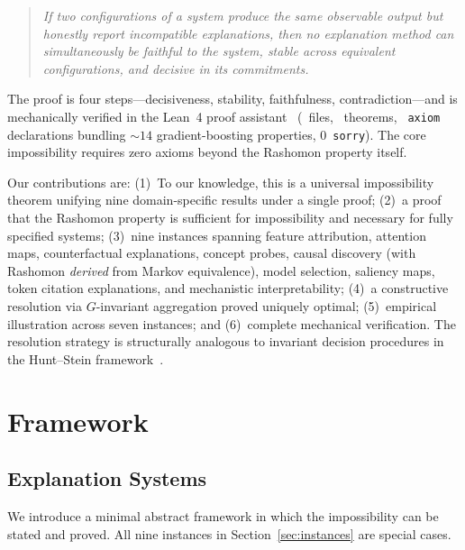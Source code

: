 \documentclass[twocolumn]{article}
\begin{document}
\begin{quote}
\emph{If two configurations of a system produce the same observable output
but honestly report incompatible explanations, then no explanation method
can simultaneously be faithful to the system, stable across equivalent
configurations, and decisive in its commitments.}
\end{quote}

\noindent
The proof is four steps---decisiveness, stability, faithfulness,
contradiction---and is mechanically verified in the Lean~4 proof
assistant~\cite{demoura2021lean4} (\ClaimMainFiles~files, \ClaimMainTheorems~theorems,
\ClaimMainAxioms~\texttt{axiom} declarations bundling ${\sim}14$ gradient-boosting
properties, 0~\texttt{sorry}). The core impossibility requires zero axioms beyond
the Rashomon property itself.

Our contributions are: (1)~To our knowledge, this is a universal impossibility theorem unifying
nine domain-specific results under a single proof; (2)~a proof that the
Rashomon property is sufficient for impossibility and necessary for fully
specified systems; (3)~nine instances spanning
feature attribution, attention maps, counterfactual explanations, concept
probes, causal discovery (with Rashomon \emph{derived} from Markov
equivalence), model selection, saliency maps, token citation explanations,
and mechanistic interpretability; (4)~a constructive resolution via
$G$-invariant aggregation proved uniquely optimal; (5)~empirical
illustration across seven instances; and (6)~complete mechanical
verification. The resolution strategy is structurally analogous to invariant decision
procedures in the Hunt--Stein framework~\cite{lehmann2005testing}.


\section{Framework}
\label{sec:framework}

\subsection{Explanation Systems}

We introduce a minimal abstract framework in which the impossibility can
be stated and proved. All nine instances in Section~\ref{sec:instances}
are special cases.
\end{document}
